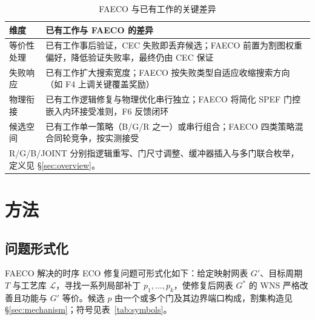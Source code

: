 \documentclass[twocolumn,10pt]{ctexart}
\begin{document}
\begin{table}[!t]
\centering
\caption{FAECO 与已有工作的关键差异}
\label{tab:related_diff}
\footnotesize
\setlength{\tabcolsep}{2pt}
\begin{tabular}{p{1.3cm}p{6.0cm}}
\toprule
\textbf{维度} & \textbf{已有工作与 FAECO 的差异} \\
\midrule
等价性处理 & 已有工作事后验证，CEC 失败即丢弃候选；FAECO 前置为割图权重偏好，降低验证失败率，最终仍由 CEC 保证 \\
失败响应 & 已有工作扩大搜索宽度；FAECO 按失败类型自适应收缩搜索方向（如 F4 上调关键覆盖奖励） \\
物理衔接 & 已有工作逻辑修复与物理优化串行独立；FAECO 将简化 SPEF 门控嵌入内环接受准则，F6 反馈闭环 \\
候选空间 & 已有工作单一策略（B/G/R 之一）或串行组合；FAECO 四类策略混合同轮竞争，按实测接受 \\
\bottomrule
\multicolumn{2}{p{7.0cm}}{\footnotesize R/G/B/JOINT 分别指逻辑重写、门尺寸调整、缓冲器插入与多门联合枚举，定义见 \S\ref{sec:overview}。}\\
\end{tabular}
\end{table}

\section{方法}

\subsection{问题形式化}
FAECO 解决的时序 ECO 修复问题可形式化如下：给定映射网表 $G'$、目标周期 $T$ 与工艺库 $\mathcal{L}$，寻找一系列局部补丁 $p_1,\dots,p_k$，使修复后网表 $G^*$ 的 WNS 严格改善且功能与 $G'$ 等价。候选 $p$ 由一个或多个门及其边界端口构成，割集构造见 \S\ref{sec:mechanism}；符号见表~\ref{tab:symbols}。
\end{document}
